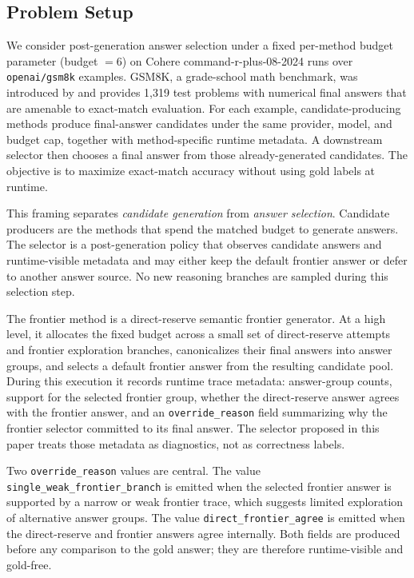 \subsection{Problem Setup}
We consider post-generation answer selection under a fixed per-method budget
parameter (budget $=6$) on Cohere command-r-plus-08-2024 runs over
\texttt{openai/gsm8k} examples. GSM8K, a grade-school math benchmark, was
introduced by \citet{cobbe2021training} and provides 1,319 test problems with
numerical final answers that are amenable to exact-match evaluation. For each
example, candidate-producing methods produce final-answer candidates under the
same provider, model, and budget cap, together with method-specific runtime
metadata. A downstream selector then chooses a final answer from those
already-generated candidates. The objective is to maximize exact-match accuracy
without using gold labels at runtime.

This framing separates \emph{candidate generation} from \emph{answer selection}.
Candidate producers are the methods that spend the matched budget to generate
answers. The selector is a post-generation policy that observes candidate answers
and runtime-visible metadata and may either keep the default frontier answer or
defer to another answer source. No new reasoning branches are sampled during this
selection step.

The frontier method is a direct-reserve semantic frontier generator. At a high
level, it allocates the fixed budget across a small set of direct-reserve attempts
and frontier exploration branches, canonicalizes their final answers into answer
groups, and selects a default frontier answer from the resulting candidate pool.
During this execution it records runtime trace metadata: answer-group counts,
support for the selected frontier group, whether the direct-reserve answer agrees
with the frontier answer, and an \texttt{override\_reason} field summarizing why
the frontier selector committed to its final answer. The selector proposed in this
paper treats those metadata as diagnostics, not as correctness labels.

Two \texttt{override\_reason} values are central. The value
\texttt{single\_weak\_frontier\_branch} is emitted when the selected frontier
answer is supported by a narrow or weak frontier trace, which suggests limited
exploration of alternative answer groups. The value
\texttt{direct\_frontier\_agree} is emitted when the direct-reserve and frontier
answers agree internally. Both fields are produced before any comparison to the
gold answer; they are therefore runtime-visible and gold-free.

